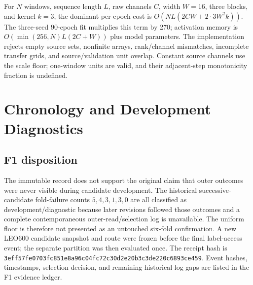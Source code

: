 \documentclass[journal]{IEEEtran}
\begin{document}
For $N$ windows, sequence length $L$, raw channels $C$, width $W=16$, three blocks, and kernel $k=3$, the dominant per-epoch cost is $O(NL(2CW+2\cdot3W^2k))$. The three-seed 90-epoch fit multiplies this term by 270; activation memory is $O(\min(256,N)L(2C+W))$ plus model parameters. The implementation rejects empty source sets, nonfinite arrays, rank/channel mismatches, incomplete transfer grids, and source/validation unit overlap. Constant source channels use the scale floor; one-window units are valid, and their adjacent-step monotonicity fraction is undefined.

\section{Chronology and Development Diagnostics}
\subsection{F1 disposition}
The immutable record does not support the original claim that outer outcomes were never visible during candidate development. The historical successive-candidate fold-failure counts $5,4,3,1,3,0$ are all classified as development/diagnostic because later revisions followed those outcomes and a complete contemporaneous outer-read/selection log is unavailable. The uniform floor is therefore not presented as an untouched six-fold confirmation. A new LEO600 candidate snapshot and route were frozen before the final label-access event; the separate partition was then evaluated once. The receipt hash is \texttt{3eff57fe\allowbreak 0703fc85\allowbreak 1e8a96c0\allowbreak 4fc72c30\allowbreak d2e20b3c\allowbreak 3de220c6\allowbreak 893ce459}. Event hashes, timestamps, selection decision, and remaining historical-log gaps are listed in the F1 evidence ledger.
\end{document}
